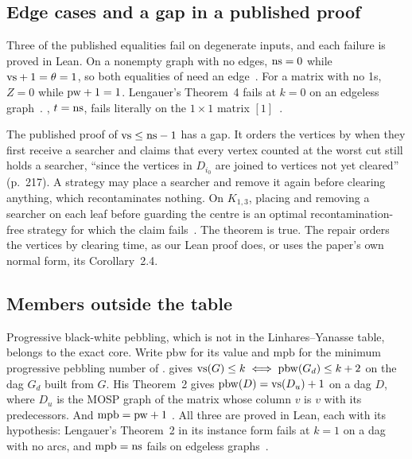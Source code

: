 \subsection{Edge cases and a gap in a published proof}
\label{app:edge}

Three of the published equalities fail on degenerate inputs, and each failure
is proved in Lean. On a nonempty graph with no edges, $\mathrm{ns}=0$ while
$\mathrm{vs}+1=\theta=1$, so both equalities of \citet{LY2002ref9,LY2002ref10} need an
edge~.
For a matrix with no 1s, $Z=0$ while $\mathrm{pw}+1=1$. Lengauer's Theorem~4 fails at
$k=0$ on an edgeless graph~.
\citet[Thm~3.9]{LY2002ref6}, $t=\mathrm{ns}$, fails literally on the $1\times1$ matrix
$[1]$~.

The published proof of $\mathrm{vs}\le\mathrm{ns}-1$ \citep[Thm~4.1]{LY2002ref10} has a gap. It
orders the vertices by when they first receive a searcher and claims that every
vertex counted at the worst cut still holds a searcher, ``since the vertices in
$D_{i_0}$ are joined to vertices not yet cleared'' (p.~217). A strategy may place
a searcher and remove it again before clearing anything, which recontaminates
nothing. On $K_{1,3}$, placing and removing a searcher on each leaf before
guarding the centre is an optimal recontamination-free strategy for which the
claim fails~. The theorem is true. The
repair orders the vertices by clearing time, as our Lean proof does, or uses the
paper's own normal form, its Corollary~2.4.

\subsection{Members outside the table}
\label{app:thirteenth}

Progressive black-white pebbling, which is not in the Linhares--Yanasse
table, belongs to the exact core. Write $\mathrm{pbw}$ for its value and
$\mathrm{mpb}$ for the minimum progressive pebbling number of
\citet{LY2002ref10}. \citet[Thm~3]{LY2002ref14} gives
$\mathrm{vs}(G)\le k\iff\mathrm{pbw}(G_d)\le k+2$ on the dag $G_d$ built from $G$. His
Theorem~2 gives $\mathrm{pbw}(D)=\mathrm{vs}(D_u)+1$ on a dag $D$, where $D_u$ is the
MOSP graph of the matrix whose column $v$ is $v$ with its predecessors. And
$\mathrm{mpb}=\mathrm{pw}+1$ \citep[Thm~3.1]{LY2002ref10}. All three are proved in Lean, each with its hypothesis: Lengauer's
Theorem~2 in its instance form fails at $k=1$ on a dag with no arcs, and
$\mathrm{mpb}=\mathrm{ns}$ fails on edgeless graphs~.

